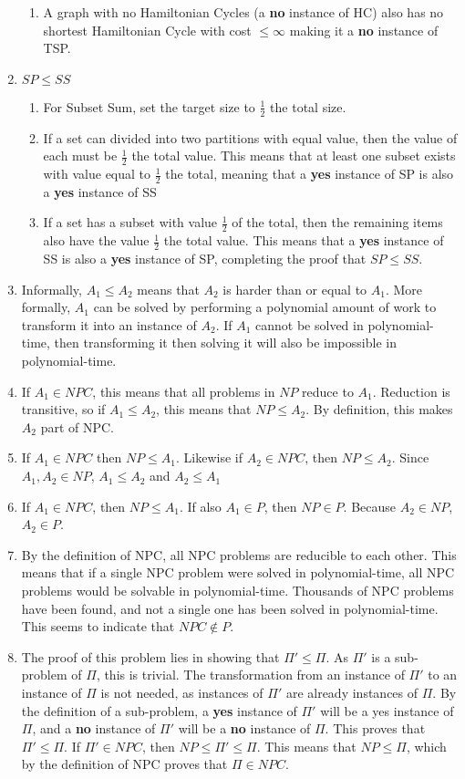\documentclass[12pt, letter]{article}
\begin{document}
\begin{enumerate}
\begin{enumerate}
	\item A graph with no Hamiltonian Cycles (a \textbf{no} instance of HC) also has no shortest Hamiltonian Cycle with cost $\le \infty$ making it a \textbf{no} instance of TSP.
\end{enumerate}
\item $SP  \le SS$
\begin{enumerate}
	\item For Subset Sum, set the target size to $\frac{1}{2}$ the total size.
	\item If a set can divided into two partitions with equal value, then the value of each must be $\frac{1}{2}$ the total value. This means that at least one subset exists with value equal to $\frac{1}{2}$ the total, meaning that a \textbf{yes} instance of SP is also a \textbf{yes} instance of SS
	\item If a set has a subset with value $\frac{1}{2}$ of the total, then the remaining items also have the value $\frac{1}{2}$ the total value. This means that a \textbf{yes} instance of SS is also a \textbf{yes} instance of SP, completing the proof that $SP \le SS$.
\end{enumerate}
\item Informally, $A_1 \le A_2$ means that $A_2$ is harder than or equal to $A_1$. More formally, $A_1$ can be solved by performing a polynomial amount of work to transform it into an instance of $A_2$. If $A_1$ cannot be solved in polynomial-time, then transforming it then solving it will also be impossible in polynomial-time.
\item If $A_1 \in NPC$, this means that all problems in $NP$ reduce to $A_1$. Reduction is transitive, so if $A_1 \le A_2$, this means that $NP \le A_2$. By definition, this makes $A_2$ part of NPC.
\item If $A_1 \in NPC$ then $NP \le A_1$. Likewise if $A_2 \in NPC$, then $NP \le A_2$. Since $A_1,A_2 \in NP$, $A_1 \le A_2$ and $A_2 \le A_1$
\item If $A_1 \in NPC$, then $NP \le A_1$. If also $A_1 \in P$, then $NP \in P$. Because $A_2 \in NP$, $A_2 \in P$.
\item By the definition of NPC, all NPC problems are reducible to each other. This means that if a single NPC problem were solved in polynomial-time, all NPC problems would be solvable in polynomial-time. Thousands of NPC problems have been found, and not a single one has been solved in polynomial-time. This seems to indicate that $NPC \notin P$.
\item The proof of this problem lies in showing that $\Pi' \le \Pi$. As  $\Pi'$ is a sub-problem of $\Pi$, this is trivial. The transformation from an instance of $\Pi'$ to an instance of $\Pi$ is not needed, as instances of $\Pi'$ are already instances of $\Pi$. By the definition of a sub-problem, a \textbf{yes} instance of $\Pi'$ will be a yes instance of $\Pi$, and a \textbf{no} instance of $\Pi'$ will be a \textbf{no} instance of $\Pi$. This proves that $\Pi' \le \Pi$. If $\Pi' \in NPC$, then $NP \le \Pi' \le \Pi$. This means that $NP \le \Pi$, which by the definition of NPC proves that  $\Pi \in NPC$.
\end{enumerate}
\end{document}
